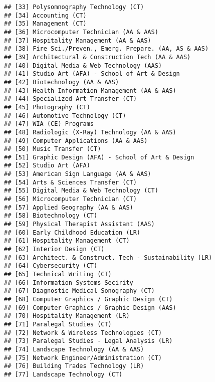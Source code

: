 \documentclass[]{article}
\begin{document}
\begin{verbatim}
## [33] Polysomnography Technology (CT)                   
## [34] Accounting (CT)                                   
## [35] Management (CT)                                   
## [36] Microcomputer Technician (AA & AAS)               
## [37] Hospitality Management (AA & AAS)                 
## [38] Fire Sci./Preven., Emerg. Prepare. (AA, AS & AAS) 
## [39] Architectural & Construction Tech (AA & AAS)      
## [40] Digital Media & Web Technology (AAS)              
## [41] Studio Art (AFA) - School of Art & Design         
## [42] Biotechnology (AA & AAS)                          
## [43] Health Information Management (AA & AAS)          
## [44] Specialized Art Transfer (CT)                     
## [45] Photography (CT)                                  
## [46] Automotive Technology (CT)                        
## [47] WIA (CE) Programs                                 
## [48] Radiologic (X-Ray) Technology (AA & AAS)          
## [49] Computer Applications (AA & AAS)                  
## [50] Music Transfer (CT)                               
## [51] Graphic Design (AFA) - School of Art & Design     
## [52] Studio Art (AFA)                                  
## [53] American Sign Language (AA & AAS)                 
## [54] Arts & Sciences Transfer (CT)                     
## [55] Digital Media & Web Technology (CT)               
## [56] Microcomputer Technician (CT)                     
## [57] Applied Geography (AA & AAS)                      
## [58] Biotechnology (CT)                                
## [59] Physical Therapist Assistant (AAS)                
## [60] Early Childhood Education (LR)                    
## [61] Hospitality Management (CT)                       
## [62] Interior Design (CT)                              
## [63] Architect. & Construct. Tech - Sustainability (LR)
## [64] Cybersecurity (CT)                                
## [65] Technical Writing (CT)                            
## [66] Information Systems Secirity                      
## [67] Diagnostic Medical Sonography (CT)                
## [68] Computer Graphics / Graphic Design (CT)           
## [69] Computer Graphics / Graphic Design (AAS)          
## [70] Hospitality Management (LR)                       
## [71] Paralegal Studies (CT)                            
## [72] Network & Wireless Technologies (CT)              
## [73] Paralegal Studies - Legal Analysis (LR)           
## [74] Landscape Technology (AA & AAS)                   
## [75] Network Engineer/Administration (CT)              
## [76] Building Trades Technology (LR)                   
## [77] Landscape Technology (CT)                         

\end{verbatim}
\end{document}
